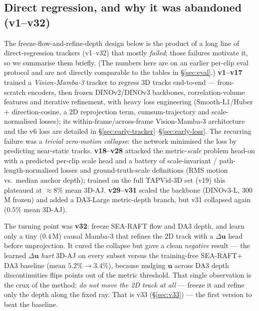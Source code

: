 \documentclass[11pt,a4paper]{article}
\begin{document}
\subsection{Direct regression, and why it was abandoned (v1--v32)}
\label{sec:prehistory}
The freeze-flow-and-refine-depth design below is the product of a long line of direct-regression trackers
(v1--v32) that mostly \emph{failed}; those failures motivate it, so we summarise them briefly. (The numbers
here are on an earlier per-clip eval protocol and are not directly comparable to the tables in
\S\ref{sec:eval}.) \textbf{v1--v17} trained a \emph{Vision-Mamba-3} tracker to regress 3D tracks end-to-end
--- from-scratch encoders, then frozen DINOv2/DINOv3 backbones, correlation-volume features and iterative
refinement, with heavy loss engineering (Smooth-L1/Huber $+$ direction-cosine, a 2D reprojection term,
cumsum-trajectory and scale-normalised losses); its within-frame/across-frame Vision-Mamba-3 architecture
and the v6 loss are detailed in \S\ref{sec:early-tracker}--\S\ref{sec:early-loss}. The recurring failure was
a \emph{trivial zero-motion collapse}: the network minimised the loss by predicting near-static tracks.
\textbf{v18--v28} attacked the metric-\emph{scale} problem head-on with a predicted per-clip scale head and a
battery of scale-invariant / path-length-normalised losses and ground-truth-scale definitions (RMS motion
vs.\ median anchor depth); trained on the full TAPVid-3D set (v19) this plateaued at ${\approx}8\%$ mean
3D-AJ. \textbf{v29--v31} scaled the backbone (DINOv3-L, $300$\,M frozen) and added a DA3-Large metric-depth
branch, but v31 collapsed again ($0.5\%$ mean 3D-AJ).

The turning point was \textbf{v32}: freeze SEA-RAFT flow and DA3 depth, and learn only a tiny ($0.4$\,M)
causal Mamba-3 that refines the 2D track with a $\Delta\mathbf{u}$ head before unprojection. It cured the
collapse but gave a clean \emph{negative} result --- the learned $\Delta\mathbf{u}$ \emph{hurt} 3D-AJ on
every subset versus the training-free SEA-RAFT$+$DA3 baseline (mean $5.2\%\!\to\!3.4\%$), because nudging
$\mathbf{u}$ across DA3 depth discontinuities flips points out of the metric threshold. That single
observation is the crux of the method: \emph{do not move the 2D track at all} --- freeze it and refine only
the depth along the fixed ray. That is v33 (\S\ref{sec:v33}) --- the first version to beat the baseline.
\end{document}
